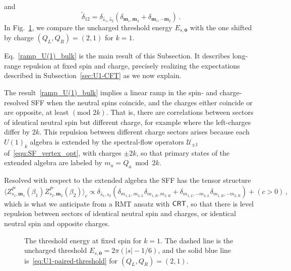 \documentclass[11pt]{article}
\numberwithin{equation}{section}
\begin{document}
and
\begin{equation}
\widetilde{\delta}_{12}
 =\delta_{\hat s_1,\hat s_2}
 \left(\delta_{\mathbf m_1,\mathbf m_2}+\delta_{\mathbf m_1,-\mathbf m_2}\right)\,.
\label{SF_delta_bulk}
\end{equation}
In Fig.~\ref{sf_fig}, we compare the uncharged threshold energy $E_{s,\mathbf{0}}$ with the  one shifted by charge $(Q_L,Q_R)=(2,1)$ for $k=1$.

Eq.~\eqref{ramp_U(1)_bulk} is the main result of this Subsection. It describes long-range repulsion at fixed spin and charge, precisely realizing the expectations described in Subsection~\ref{sec:U1-CFT} as we now explain. 

The result~\eqref{ramp_U(1)_bulk} implies a linear ramp in the spin- and charge-resolved SFF when the neutral spins coincide, and the charges either coincide or are opposite, at least $(\text{mod }2k)$. That is, there are correlations between sectors of identical neutral spin but different charge, for example where the left-charges differ by $2k$. This repulsion between different charge sectors arises because each $U(1)_k$ algebra is extended by the spectral-flow operators $\mathcal U_{\pm1}$ of~\eqref{equ:SF_vertex_opt}, with charges $\pm2k$, so that primary states of the extended algebra are labeled by $m_a=Q_a\bmod2k$.

Resolved with respect to the extended algebra the SFF has the tensor structure
\begin{equation}
    \langle Z^P_{s_1,\mathbf{m}_1}(\beta_1)Z^P_{s_2,\mathbf{m}_2}(\beta_2) \rangle_c \propto \delta_{\hat{s}_1,\hat{s}_2}\left( \delta_{m_{1,L},m_{2,L}}\delta_{m_{1,R},m_{2,R}} + \delta_{m_{1,L},-m_{2,L}}\delta_{m_{1,R},-m_{2,R}}\right) + (c>0)\,,
\end{equation}
which is what we anticipate from a RMT ansatz with $\mathsf{CRT}$, so that there is level repulsion between sectors of identical neutral spin and charges, or identical neutral spin and opposite charges.


\begin{figure}[htbp]
\centering
{}
\caption{The threshold energy at fixed spin for $k=1$. The dashed line is the uncharged threshold $E_{s,\mathbf 0}=2\pi(|s|-1/6)$, and the solid blue line is~\eqref{eq:U1-paired-threshold} for $(Q_L,Q_R)=(2,1)$.}
\label{sf_fig}
\end{figure}
\end{document}
